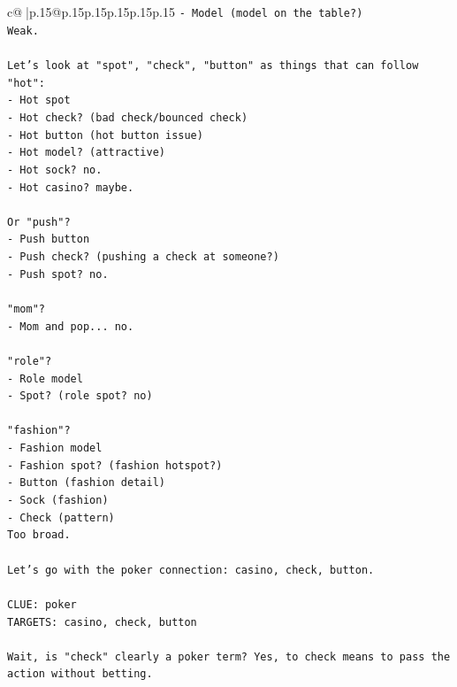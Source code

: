 \documentclass{article}
\begin{document}
{\begin{supertabular}{c@{$\;$}|p{.15\linewidth}@{}p{.15\linewidth}p{.15\linewidth}p{.15\linewidth}p{.15\linewidth}p{.15\linewidth}}
{{{\texttt{{-} Model (model on the table?)} \\
\texttt{Weak.} \\
\\ 
\texttt{Let's look at "spot", "check", "button" as things that can follow "hot":} \\
\texttt{{-} Hot spot} \\
\texttt{{-} Hot check? (bad check/bounced check)} \\
\texttt{{-} Hot button (hot button issue)} \\
\texttt{{-} Hot model? (attractive)} \\
\texttt{{-} Hot sock? no.} \\
\texttt{{-} Hot casino? maybe.} \\
\\ 
\texttt{Or "push"?} \\
\texttt{{-} Push button} \\
\texttt{{-} Push check? (pushing a check at someone?)} \\
\texttt{{-} Push spot? no.} \\
\\ 
\texttt{"mom"?} \\
\texttt{{-} Mom and pop... no.} \\
\\ 
\texttt{"role"?} \\
\texttt{{-} Role model} \\
\texttt{{-} Spot? (role spot? no)} \\
\\ 
\texttt{"fashion"?} \\
\texttt{{-} Fashion model} \\
\texttt{{-} Fashion spot? (fashion hotspot?)} \\
\texttt{{-} Button (fashion detail)} \\
\texttt{{-} Sock (fashion)} \\
\texttt{{-} Check (pattern)} \\
\texttt{Too broad.} \\
\\ 
\texttt{Let's go with the poker connection: casino, check, button.} \\
\\ 
\texttt{CLUE: poker} \\
\texttt{TARGETS: casino, check, button} \\
\\ 
\texttt{Wait, is "check" clearly a poker term? Yes, to check means to pass the action without betting.} \\
}}}
\end{supertabular}}
\end{document}
